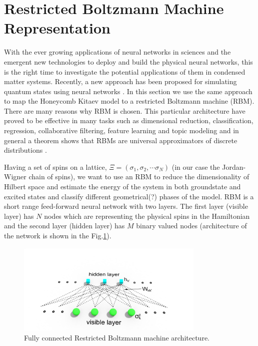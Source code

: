 \documentclass{article}
\begin{document}
\section{Restricted Boltzmann Machine Representation}

With the ever growing applications of neural networks in sciences and the emergent new technologies to deploy and build the physical neural networks, this is the right time to investigate the potential applications of them in condensed matter systems. Recently, a new approach has been proposed for simulating quantum states using neural networks \cite{24 of Das Sarmaa}. In this section we use the same approach to map the Honeycomb Kitaev model to a restricted Boltzmann machine (RBM). There are many reasons why RBM is chosen. This particular architecture have proved to be effective in many tasks such as dimensional reduction, classification, regression, collaborative filtering, feature learning and topic modeling and in general a theorem shows that RBMs are universal approximators of discrete distributions \cite{https://pathmind.com/wiki/use-cases - 33-38 of DasSarma and rep power paper}.

Having a set of spins on a lattice, $\Xi=(\sigma_{1},\sigma_{2},\cdots\sigma_{N})$ (in our case the Jordan-Wigner chain of spins), we want to use an RBM to reduce the dimensionality of Hilbert space and estimate the energy of the system in both groundstate and excited states and classify different geometrical(?) phases of the model. RBM is a short range feed-forward neural network with two layers. The first layer (visible layer) has $N$ nodes which are representing the physical spins in the Hamiltonian and the second layer (hidden layer) has $M$ binary valued nodes (architecture of the network is shown in the Fig.\ref{rbm-arc}). 

\begin{figure}[!htb]
	\centering
	\includegraphics[width=0.8\textwidth]{./images/rbm}
	\caption{\label{rbm-arc} Fully connected Restricted Boltzmann machine architecture.}
\end{figure}
\end{document}
